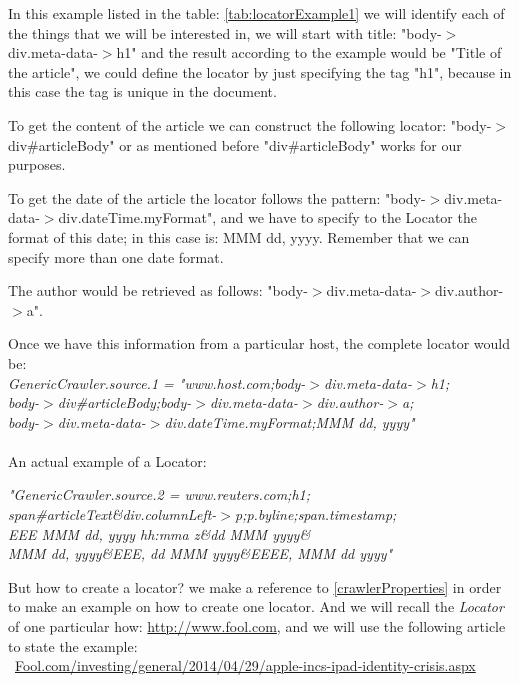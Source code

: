 In this example listed in the table: \ref{tab:locatorExample1} we will identify each of the things that we will be interested in, we will start with title: "body-$>$div.meta-data-$>$h1" and the result according to the example would be "Title of the article", we could define the locator by just specifying the tag "h1", because in this case the tag is unique in the document.

To get the content of the article we can construct the following locator: "body-$>$div\#articleBody" or as mentioned before "div\#articleBody" works for our purposes.

To get the date of the article the locator follows the pattern: "body-$>$div.meta-data-$>$div.dateTime.myFormat", and we have to specify to the Locator the format of this date; in this case is: MMM dd, yyyy. Remember that we can specify more than one date format.

The author would be retrieved as follows: "body-$>$div.meta-data-$>$div.author-$>$a".

Once we have this information from a particular host, the complete locator would be:\\
\emph{
GenericCrawler.source.1 = "www.host.com;body-$>$div.meta-data-$>$h1;\\
body-$>$div\#articleBody;body-$>$div.meta-data-$>$div.author-$>$a;\\
body-$>$div.meta-data-$>$div.dateTime.myFormat;MMM dd, yyyy"
}
\\\\
An actual example of a Locator:

\emph{
"GenericCrawler.source.2 = www.reuters.com;h1;\\
span\#articleText\&div.columnLeft-$>$p;p.byline;span.timestamp;\\
EEE MMM dd, yyyy hh:mma z\&dd MMM yyyy\&\\
MMM dd, yyyy\&EEE, dd MMM yyyy\&EEEE, MMM dd yyyy"}

But how to create a locator? we make a reference to \ref{crawlerProperties} in order to make an example on how to create one locator. And we will recall the \emph{Locator} of one particular how: \url{http://www.fool.com}, and we will use the following article to state the example:\\\ \url{Fool.com/investing/general/2014/04/29/apple-incs-ipad-identity-crisis.aspx}

